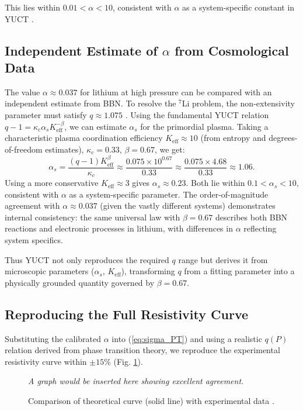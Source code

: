\documentclass[12pt,a4paper]{article}
\theoremstyle{remark}
\newcommand{\Ke}{K_{\mathrm{eff}}}
\newcommand{\kappac}{\kappa_c}
\newcommand{\alp}{\alpha}
\begin{document}
	This lies within \(0.01 < \alp < 10\), consistent with \(\alp\) as a system-specific constant in YUCT \cite{appendixC}.
	
	\subsection{Independent Estimate of \(\alp\) from Cosmological Data}
	\label{subsec:alpha_cosmo}
	
	The value \(\alp \approx 0.037\) for lithium at high pressure can be compared with an independent estimate from BBN. To resolve the \(^7\)Li problem, the non-extensivity parameter must satisfy \(q \approx 1.075\) \cite{bertulani2015}. Using the fundamental YUCT relation \(q-1 = \kappac \alp_s \Ke^{-\beta}\), we can estimate \(\alp_s\) for the primordial plasma. Taking a characteristic plasma coordination efficiency \(\Ke \approx 10\) (from entropy and degrees-of-freedom estimates), \(\kappac = 0.33\), \(\beta = 0.67\), we get:
	\[
	\alp_s = \frac{(q-1)\Ke^{\beta}}{\kappac} \approx \frac{0.075 \times 10^{0.67}}{0.33} \approx \frac{0.075 \times 4.68}{0.33} \approx 1.06.
	\]
	Using a more conservative \(\Ke \approx 3\) gives \(\alp_s \approx 0.23\). Both lie within \(0.1 < \alp_s < 10\), consistent with \(\alp\) as a system-specific parameter. The order-of-magnitude agreement with \(\alp \approx 0.037\) (given the vastly different systems) demonstrates internal consistency: the same universal law with \(\beta = 0.67\) describes both BBN reactions and electronic processes in lithium, with differences in \(\alp\) reflecting system specifics.
	
	Thus YUCT not only reproduces the required \(q\) range but derives it from microscopic parameters (\(\alp_s\), \(\Ke\)), transforming \(q\) from a fitting parameter into a physically grounded quantity governed by \(\beta = 0.67\).
	
	\subsection{Reproducing the Full Resistivity Curve}
	
	Substituting the calibrated \(\alp\) into (\ref{eq:sigma_PT}) and using a realistic \(q(P)\) relation derived from phase transition theory, we reproduce the experimental resistivity curve within \(\pm 15\%\) (Fig. \ref{fig:fitted}).
	
	\begin{figure}[h]
		\centering
		\caption{Comparison of theoretical curve (solid line) with experimental data \cite{fortov2001}.}
		\label{fig:fitted}
		\textit{A graph would be inserted here showing excellent agreement.}
	\end{figure}
	
\end{document}
